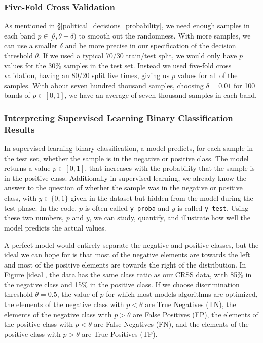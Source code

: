 \FloatBarrier


\FloatBarrier
\subsubsection{Five-Fold Cross Validation}
\label{cross_validation}

As mentioned in \S\ref{political_decisions_probability}, 
we need enough samples in each band $p \in [\theta, \theta + \delta)$ to smooth out the randomness.  With more samples, we can use a smaller $\delta$ and be more precise in our specification of the decision threshold $\theta$.  If we used a typical 70/30 train/test split, we would only have $p$ values for the 30\% samples in the test set.  Instead we used five-fold cross validation, having an 80/20 split five times, giving us $p$ values for all of the samples.  With about seven hundred thousand samples, choosing $\delta = 0.01$ for 100 bands of $p \in [0,1]$, we have an average of seven thousand samples in each band.  

\FloatBarrier
\subsubsection{Interpreting Supervised Learning Binary Classification Results}
\label{interpreting_ideal}

In supervised learning binary classification, a model predicts, for each sample in the test set, whether the sample is in the negative or positive class.  The model returns a value $p \in [0,1]$, that increases with the probability that the sample is in the positive class.  Additionally in supervised learning, we already know the answer to the question of whether the sample was in the negative or positive class, with $y \in \{0,1\}$ given in the dataset but hidden from the model during the test phase.  In the code, $p$ is often called \verb|y_proba| and $y$ is called \verb|y_test|.  Using these two numbers, $p$ and $y$, we can study, quantify, and illustrate how well the model predicts the actual values.  

A perfect model would entirely separate the negative and positive classes, but the ideal we can hope for is that most of the negative elements are towards the left and most of the positive elements are towards the right of the distribution.  In Figure \ref{ideal}, the data has the same class ratio as our CRSS data, with 85\% in the negative class and 15\% in the positive class.  If we choose discrimination threshold $\theta = 0.5$, the value of $p$ for which most models algorithms are optimized, the elements of the negative class with $p<\theta$ are True Negatives (TN), the elements of the negative class with $p > \theta$ are False Positives (FP), the elements of the positive class with $p < \theta$ are False Negatives (FN), and the elements of the positive class with $p > \theta$ are True Positives (TP).  

